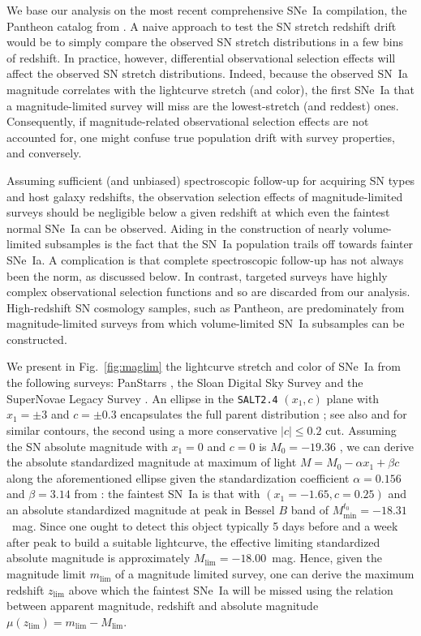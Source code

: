\documentclass[]{aa}
\begin{document}
We base our analysis on the most recent comprehensive SNe~Ia compilation, the
Pantheon catalog from \cite{scolnic2018a}. A naive approach to test the SN
stretch redshift drift would be to simply compare the observed SN stretch
distributions in a few bins of redshift. In practice, however, differential
observational selection effects will affect the observed SN
stretch distributions. Indeed, because the observed SN~Ia magnitude correlates
with the lightcurve stretch (and color), the first SNe~Ia that a
magnitude-limited survey will miss are the lowest-stretch (and reddest) ones.
Consequently, if magnitude-related observational selection effects are
not accounted for, one might confuse true population drift with survey
properties, and conversely.

Assuming sufficient (and unbiased) spectroscopic follow-up for acquiring
SN types and host galaxy redshifts, the observation selection
effects of magnitude-limited surveys should be negligible below a given redshift
at which even the faintest normal SNe~Ia can be observed.
Aiding in the construction of nearly volume-limited subsamples is the
    fact that the SN~Ia population trails off towards fainter SNe~Ia. A
    complication is that complete spectroscopic follow-up has not always been
    the norm, as discussed below. In contrast, targeted surveys have highly
    complex observational selection functions and so are
    discarded from our analysis. High-redshift SN cosmology samples,
    such as Pantheon, are predominately from magnitude-limited surveys from
which volume-limited SN~Ia subsamples can be constructed.

We present in Fig.~\ref{fig:maglim} the lightcurve stretch and color of SNe~Ia
from the following surveys: PanStarrs \citep[PS1][]{rest2014}, the Sloan Digital
Sky Survey \citep[SDSS][]{frieman2008} and the SuperNovae Legacy Survey
\citep[SNLS][]{astier2006}. An ellipse in the \textsc{\texttt{SALT2.4}} $(x_1,
c)$ plane with $x_1 = \pm 3$ and $c = \pm 0.3$ encapsulates the full
parent distribution \citep{guy2007, betoule2014}; see also
\citet{bazin2011} and \citet{campbell2013} for similar contours, the second
using a more conservative $|c| \leq 0.2$ cut. Assuming the SN absolute magnitude
with $x_1=0$ and $c=0$ is $M_0=-19.36$ \citep{kessler2009,scolnic2014}, we can
derive the absolute standardized magnitude at maximum of light $M = M_0 - \alpha
x_1 + \beta c$ along the aforementioned ellipse given the standardization
coefficient $\alpha=0.156$ and $\beta=3.14$ from \cite{scolnic2018a}: the
faintest SN~Ia is that with $(x_1=-1.65, c=0.25)$ and an absolute standardized
magnitude at peak in Bessel $B$ band of $M^{t_0}_{\min} = -18.31$~mag. Since one
ought to detect this object typically 5 days before and a week after peak to
build a suitable lightcurve, the effective limiting standardized absolute
magnitude is approximately $M_{\lim} = -18.00$~mag. Hence, given the magnitude
limit $m_{\lim}$ of a magnitude limited survey, one can derive the maximum
redshift $z_{\lim}$ above which the faintest SNe~Ia will be missed using the
relation between apparent magnitude, redshift and absolute magnitude
$\mu(z_{\lim}) = m_{\lim} - M_{\lim}$.
\end{document}
